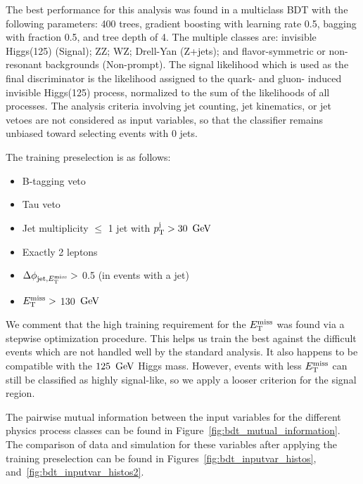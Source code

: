 The best performance for this analysis was found in a multiclass BDT with the following parameters: 400 trees, gradient boosting with learning rate 0.5, bagging with fraction 0.5, and tree depth of 4.
The multiple classes are: invisible Higgs(125) (Signal); ZZ; WZ; Drell-Yan (Z+jets); and flavor-symmetric or non-resonant backgrounds (Non-prompt).
The signal likelihood which is used as the final discriminator is the likelihood assigned to the quark- and gluon- induced invisible Higgs(125) process, normalized to the sum of the likelihoods of all processes.
The analysis criteria involving jet counting, jet kinematics, or jet vetoes are not considered as input variables, so that the classifier remains unbiased toward selecting events with 0 jets.

The training preselection is as follows:
\begin{itemize}
\item B-tagging veto
\item Tau veto
\item Jet multiplicity $\leq$ 1 jet with $p_{\mathrm{T}}^{\rm j} > 30~\,\text{Ge\hspace{-.08em}V}$
\item Exactly 2 leptons
\item $\Delta \phi_{{\rm jet},E_\mathrm{T}^{\mathrm{miss}}} >$ 0.5 (in events with a jet)
\item $E_\mathrm{T}^{\mathrm{miss}} >$ 130 $\,\text{Ge\hspace{-.08em}V}$
\end{itemize}
We comment that the high training requirement for the $E_\mathrm{T}^{\mathrm{miss}}$ was found via a stepwise optimization procedure.
This helps us train the best against the difficult events which are not handled well by the standard analysis.
It also happens to be compatible with the $125~\,\text{Ge\hspace{-.08em}V}$ Higgs mass.
However, events with less $E_\mathrm{T}^{\mathrm{miss}}$ can still be classified as highly signal-like, so we apply a looser criterion for the signal region.



The pairwise mutual information between the input variables for the different physics process classes can be found in Figure~\ref{fig:bdt_mutual_information}.
The comparison of data and simulation for these variables after applying the training preselection can be found in Figures~\ref{fig:bdt_inputvar_histos}, and~\ref{fig:bdt_inputvar_histos2}.

